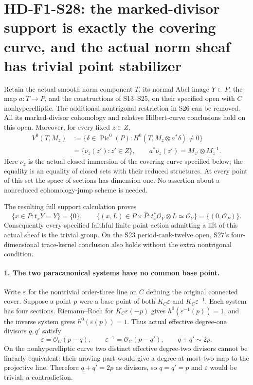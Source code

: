 \section[HD-F1-S28: complete marked-divisor support and trivial point stabilizer]{HD-F1-S28: the marked-divisor support is exactly the covering curve, and the actual norm sheaf has trivial point stabilizer}
\label{sec:f1-norm-fourfold-marked-support-stabilizer}

Retain the actual smooth norm component $T$, its normal Abel
image $Y\subset P$, the map $a:T\to P$, and the constructions
of S13--S25, on their specified open with $C$ nonhyperelliptic.
The additional nontrigonal restriction in S26 can be removed.
All its marked-divisor cohomology and relative Hilbert-curve
conclusions hold on this open. Moreover, for every fixed $z\in Z$,
\[
 \begin{split}
 V^0(T,M_z)
  &:=\{\delta\in\operatorname{Pic}^0(P):
             H^0(T,M_z\otimes a^*\delta)\ne0\}\\
  &=\{\nu_z(z'):z'\in Z\},\qquad
          a^*\nu_z(z')=M_{z'}\otimes M_z^{-1}.
 \end{split}
 \tag{F1S28.1}
\]
Here $\nu_z$ is the actual closed immersion of the covering
curve specified below; the equality is an equality of closed
sets with their reduced structures. At every point of this
set the space of sections has dimension one. No assertion
about a nonreduced cohomology-jump scheme is needed.

The resulting full support calculation proves
\[
 \{x\in P:t_xY=Y\}=\{0\},\qquad
 \{(x,L)\in P\times\widehat P:
           t_x^*\mathcal O_Y\otimes L\simeq\mathcal O_Y\}
                      =\{(0,\mathcal O_P)\}.
 \tag{F1S28.2}
\]
Consequently every specified faithful finite point action
admitting a lift of this actual sheaf is the trivial group.
On the S23 period-rank-twelve open, S27's four-dimensional
trace-kernel conclusion also holds without the extra
nontrigonal condition.

\paragraph{1. The two paracanonical systems have no common base point.}
Write $\varepsilon$ for the nontrivial order-three line on
$C$ defining the original connected cover. Suppose a point
$p$ were a base point of both $K_C\varepsilon$ and
$K_C\varepsilon^{-1}$. Each system has four sections.
Riemann--Roch for $K_C\varepsilon(-p)$ gives
$h^0(\varepsilon^{-1}(p))=1$, and the inverse system gives
$h^0(\varepsilon(p))=1$. Thus actual effective degree-one
divisors $q,q'$ satisfy
\[
       \varepsilon=\mathcal O_C(p-q),\qquad
       \varepsilon^{-1}=\mathcal O_C(p-q'),\qquad
                              q+q'\sim2p.
 \tag{F1S28.3}
\]
On the nonhyperelliptic curve two distinct effective
degree-two divisors cannot be linearly equivalent: their
moving part would give a degree-at-most-two map to the
projective line. Therefore $q+q'=2p$ as divisors, so
$q=q'=p$ and $\varepsilon$ would be trivial, a contradiction.

